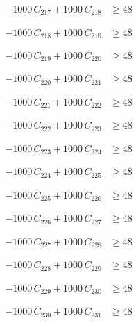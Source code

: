 \documentclass[a4paper,11pt]{article}
\begin{document}
\begin{align}
-1000\,C_{217} + 1000\,C_{218} &\geq 48 \nonumber
\end{align}

\begin{align}
-1000\,C_{218} + 1000\,C_{219} &\geq 48 \nonumber
\end{align}

\begin{align}
-1000\,C_{219} + 1000\,C_{220} &\geq 48 \nonumber
\end{align}

\begin{align}
-1000\,C_{220} + 1000\,C_{221} &\geq 48 \nonumber
\end{align}

\begin{align}
-1000\,C_{221} + 1000\,C_{222} &\geq 48 \nonumber
\end{align}

\begin{align}
-1000\,C_{222} + 1000\,C_{223} &\geq 48 \nonumber
\end{align}

\begin{align}
-1000\,C_{223} + 1000\,C_{224} &\geq 48 \nonumber
\end{align}

\begin{align}
-1000\,C_{224} + 1000\,C_{225} &\geq 48 \nonumber
\end{align}

\begin{align}
-1000\,C_{225} + 1000\,C_{226} &\geq 48 \nonumber
\end{align}

\begin{align}
-1000\,C_{226} + 1000\,C_{227} &\geq 48 \nonumber
\end{align}

\begin{align}
-1000\,C_{227} + 1000\,C_{228} &\geq 48 \nonumber
\end{align}

\begin{align}
-1000\,C_{228} + 1000\,C_{229} &\geq 48 \nonumber
\end{align}

\begin{align}
-1000\,C_{229} + 1000\,C_{230} &\geq 48 \nonumber
\end{align}

\begin{align}
-1000\,C_{230} + 1000\,C_{231} &\geq 48 \nonumber
\end{align}
\end{document}
